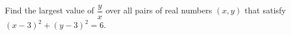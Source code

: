 Find the largest value of $\dfrac{y}{x}$ over all pairs of real numbers $(x,y)$ that satisfy $(x-3)^2+(y-3)^2=6$.
